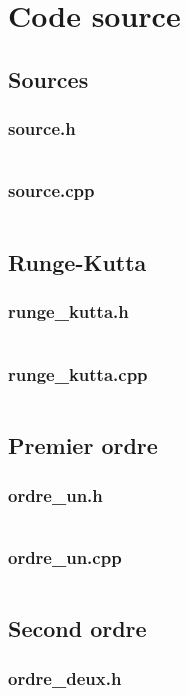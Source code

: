 \documentclass{report}
\begin{document}
\appendix
\chapter{Code source}
\section{Sources}
\subsection{source.h}
\inputminted[linenos,fontsize=\scriptsize]{c++}{../src/source.h}
\subsection{source.cpp}
\inputminted[linenos,fontsize=\scriptsize]{c++}{../src/source.cpp}

\section{Runge-Kutta}
\subsection{runge\_kutta.h}
\inputminted[linenos,fontsize=\scriptsize]{c++}{../src/runge_kutta.h}
\subsection{runge\_kutta.cpp}
\inputminted[linenos,fontsize=\scriptsize]{c++}{../src/runge_kutta.cpp}

\section{Premier ordre}
\subsection{ordre\_un.h}
\inputminted[linenos,fontsize=\scriptsize]{c++}{../src/source.h}
\subsection{ordre\_un.cpp}
\inputminted[linenos,fontsize=\scriptsize]{c++}{../src/source.cpp}

\section{Second ordre}
\subsection{ordre\_deux.h}
\inputminted[linenos,fontsize=\scriptsize]{c++}{../src/source.h}
\end{document}
